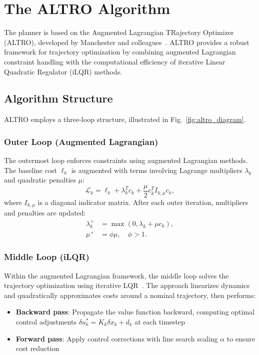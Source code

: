 \documentclass[conference]{IEEEtran}
\begin{document}
\section{The ALTRO Algorithm}\label{sec:altro}

The planner is based on the Augmented Lagrangian TRajectory Optimizer (ALTRO), developed by Manchester and colleagues~\cite{howell_altro_2019,jackson_al_ilqr_tutorialpdf_2019}. ALTRO provides a robust framework for trajectory optimization by combining augmented Lagrangian constraint handling with the computational efficiency of iterative Linear Quadratic Regulator (iLQR) methods.

\subsection{Algorithm Structure}\label{subsec:altro_structure}

ALTRO employs a three-loop structure, illustrated in Fig.~\ref{fig:altro_diagram}.

\subsubsection{Outer Loop (Augmented Lagrangian)}\label{subsubsec:outer_loop}
The outermost loop enforces constraints using augmented Lagrangian methods. The baseline cost $\ell_k$ is augmented with terms involving Lagrange multipliers $\lambda_k$ and quadratic penalties $\mu$:
\begin{equation}\label{eq:augmented_lagrangian}
\mathcal{L}_k = \ell_k + \lambda_k^T c_k + \frac{\mu}{2} c_k^T I_{k,\mu} c_k,
\end{equation}
where $I_{k,\mu}$ is a diagonal indicator matrix. After each outer iteration, multipliers and penalties are updated:
\begin{align}
\lambda_k^+ &= \max(0, \lambda_k + \mu c_k), \label{eq:lambda_update}\\
\mu^+ &= \phi \mu, \quad \phi > 1. \label{eq:mu_update}
\end{align}

\subsubsection{Middle Loop (iLQR)}\label{subsubsec:middle_loop}
Within the augmented Lagrangian framework, the middle loop solves the trajectory optimization using iterative LQR~\cite{todorov2005generalized}. The approach linearizes dynamics and quadratically approximates costs around a nominal trajectory, then performs:
\begin{itemize}
    \item \textbf{Backward pass}: Propagate the value function backward, computing optimal control adjustments $\delta u_k^* = K_k \delta x_k + d_k$ at each timestep
    \item \textbf{Forward pass}: Apply control corrections with line search scaling $\alpha$ to ensure cost reduction
\end{itemize}
\end{document}
